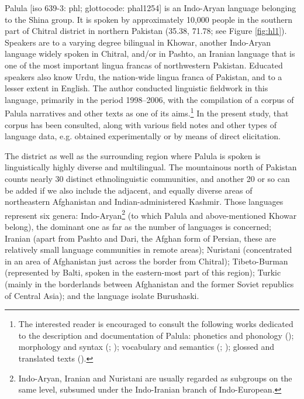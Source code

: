 \documentclass[output=paper]{langsci/langscibook}
\begin{document}
Palula [iso 639-3: phl; glottocode: phal1254] is an Indo-Aryan language belonging to the Shina group. It is spoken by approximately 10,000 people in the southern part of Chitral district in northern Pakistan (35.38, 71.78; see Figure \ref{fig:hl1}). Speakers are to a varying degree bilingual in Khowar, another Indo-Aryan language widely spoken in Chitral, and/or in Pashto, an Iranian language that is one of the most important lingua francas of northwestern Pakistan. Educated speakers also know Urdu, the nation-wide lingua franca of Pakistan, and to a lesser extent in English. The author conducted linguistic fieldwork in this language, primarily in the period 1998--2006, with the compilation of a corpus of Palula narratives and other texts as one of its aims.\footnote{The interested reader is encouraged to consult the following works dedicated to the description and documentation of Palula: phonetics and phonology (\citealt{LiljegrenHaider2009}); morphology and syntax (\citealt{Liljegren2010}; \citeyear{Liljegren2016}); vocabulary and semantics (\citealt{LiljegrenHaider2011}; \citeyear{LiljegrenHaider2015a}); glossed and translated texts (\citealt{LiljegrenHaider2015b}).} 
In the present study, that corpus has been consulted, along with various field notes and other types of language data, e.g. obtained experimentally or by means of direct elicitation. 

The district as well as the surrounding region where Palula is spoken is linguistically highly diverse and multilingual. The mountainous north of Pakistan counts nearly 30 distinct ethnolinguistic communities, and another 20 or so can be added if we also include the adjacent, and equally diverse areas of northeastern Afghanistan and Indian-administered Kashmir. Those languages represent six genera: Indo-Aryan\footnote{Indo-Aryan, Iranian and Nuristani are usually regarded as subgroups on the same level, subsumed under the Indo-Iranian branch of Indo-European.} (to which Palula and above-mentioned Khowar belong), the dominant one as far as the number of languages is concerned; Iranian (apart from Pashto and Dari, the Afghan form of Persian, these are relatively small language communities in remote areas); Nuristani (concentrated in an area of Afghanistan just across the border from Chitral); Tibeto-Burman (represented by Balti, spoken in the eastern-most part of this region); Turkic (mainly in the borderlands between Afghanistan and the former Soviet republics of Central Asia); and the language isolate Burushaski.
\end{document}
